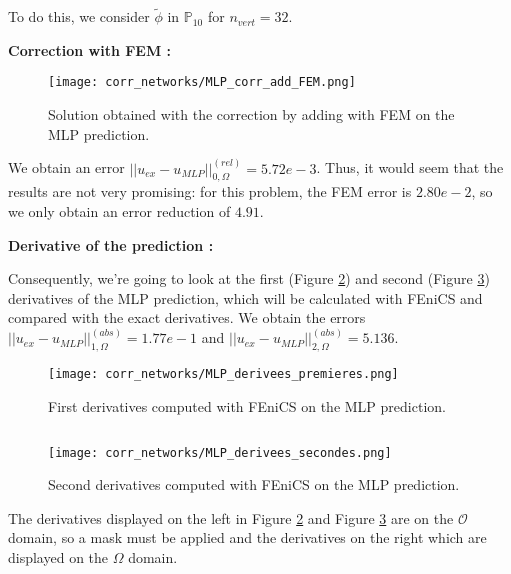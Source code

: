 To do this, we consider $\tilde{\phi}$ in $\mathbb{P}_10$ for $n_{vert}=32$.

\textbf{Correction with FEM :}

\begin{figure}[H]
	\centering
	\texttt{[image: corr\_networks/MLP\_corr\_add\_FEM.png]}
	\caption{Solution obtained with the correction by adding with FEM on the MLP prediction.}
	\label{corr_networks_MLP_corr_add_FEM}
\end{figure}

We obtain an error $||u_{ex}-u_{MLP}||_{0,\Omega}^{(rel)}=5.72e-3$. Thus, it would seem that the results are not very promising: for this problem, the FEM error is $2.80e-2$, so we only obtain an error reduction of $4.91$.

\textbf{Derivative of the prediction :}

Consequently, we're going to look at the first (Figure \ref{corr_networks_MLP_derivees_premieres}) and second (Figure \ref{corr_networks_MLP_derivees_secondes}) derivatives of the MLP prediction, which will be calculated with FEniCS and compared with the exact derivatives. We obtain the errors $||u_{ex}-u_{MLP}||_{1,\Omega}^{(abs)}=1.77e-1$ and $||u_{ex}-u_{MLP}||_{2,\Omega}^{(abs)}=5.136$.

\begin{minipage}{0.48\linewidth}
	\begin{figure}[H]
		\centering
		\texttt{[image: corr\_networks/MLP\_derivees\_premieres.png]}
		\caption{First derivatives computed with FEniCS on the MLP prediction.}
		\label{corr_networks_MLP_derivees_premieres}
	\end{figure} 
\end{minipage} $\qquad$
\begin{minipage}{0.48\linewidth}
	\begin{figure}[H]
		\centering
		\texttt{[image: corr\_networks/MLP\_derivees\_secondes.png]}
		\caption{Second derivatives computed with FEniCS on the MLP prediction.}
		\label{corr_networks_MLP_derivees_secondes}
	\end{figure} 
\end{minipage}

\begin{Rem}
	The derivatives displayed on the left in Figure \ref{corr_networks_MLP_derivees_premieres} and Figure \ref{corr_networks_MLP_derivees_secondes} are on the $\mathcal{O}$ domain, so a mask must be applied and the derivatives on the right which are displayed on the $\Omega$ domain.
\end{Rem}


